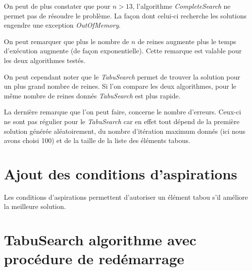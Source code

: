 \documentclass[a4paper,10pt]{article}
\begin{document}
On peut de plus constater que pour $n>13$, l'algorithme \emph{CompleteSearch} ne permet pas de résoudre le problème. La façon dont celui-ci recherche les solutions engendre une exception \emph{OutOfMemory}.

On peut remarquer que plus le nombre de $n$ de reines augmente plus le temps d'exécution augmente (de façon exponentielle). Cette remarque est valable pour les deux algorithmes testés.

On peut cependant noter que le \emph{TabuSearch} permet de trouver la solution pour un plus grand nombre de reines. Si l'on compare les deux algorithmes, pour le même nombre de reines donnés \emph{TabuSearch} est plus rapide.

La dernière remarque que l'on peut faire, concerne le nombre d'erreurs. Ceux-ci ne sont pas régulier pour le \emph{TabuSearch} car en effet tout dépend de la première solution générée aléatoirement, du nombre d'itération maximum donnés (ici nous avons choisi 100) et de la taille de la liste des éléments tabous. 

\section{Ajout des conditions d'aspirations}
Les conditions d'aspirations permettent d'autoriser un élément tabou s'il améliore la meilleure solution.

\section{TabuSearch algorithme avec procédure de redémarrage}
\end{document}
